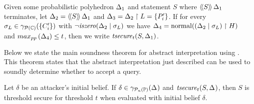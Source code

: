 %

\begin{definition}
Given some probabilistic polyhedron $\pps{1}$ and statement $ S $ where
$ \abspevalp{S}{\pps{1}} $ terminates, let $\pps{2} =
\abspevalp{S}{\pps{1}}$ and $\pps{3} = \project{\pps{2}}{L} =
\set{\pp{i}'}$. If for every $ \sigma_L \in \psconc{\set{\poly_{i}'}} $
with $ \neg\iszero{\absdcond{\pps{2}}{\sigma_L}} $ we have $ \pps{4} =
\normal{\project{\paren{\absdcond{\pps{2}}{\sigma_L}}}{H}} $ and
$ \ppsmax{\pps{4}} \leq t $, then we write $\abspolicy{S}{\pps{1}}{t}$.
\end{definition}

Below we state the main soundness theorem for abstract interpretation
using \ppsnames{}.  This theorem states that the abstract
interpretation just described can be used to soundly determine whether
to accept a query.

\begin{theorem}
\label{thm:ppp:secure}
  Let $\delta$ be an attacker's initial belief.  If $\delta \in
  \ppsconc{\pps{}}$ and $\abspolicy{S}{\pps{}}{t}$, then $ S $ is threshold secure
  for threshold $t$ when evaluated with initial belief $\delta$.
\end{theorem}



